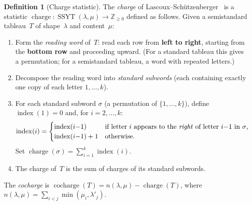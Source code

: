 \documentclass[11pt]{article}
\theoremstyle{plain}
\theoremstyle{definition}
\newtheorem{definition}[theorem]{Definition}
\theoremstyle{remark}
\newcommand{\Z}{\mathbb{Z}}
\newcommand{\charge}{\operatorname{charge}}
\newcommand{\cocharge}{\operatorname{cocharge}}
\newcommand{\SSYT}{\operatorname{SSYT}}
\begin{document}
\begin{definition}[Charge statistic]\label{def:charge}
The \emph{charge} of Lascoux--Sch\"utzen\-ber\-ger~\cite{LS78}
is a statistic $\charge : \SSYT(\lambda, \mu) \to \Z_{\geq 0}$
defined as follows.  Given a semistandard tableau~$T$ of
shape~$\lambda$ and content~$\mu$:
\begin{enumerate}
\item Form the \emph{reading word} of~$T$: read each row
  from \textbf{left to right}, starting from the \textbf{bottom
  row} and proceeding upward.
  (For a standard tableau this gives a permutation;
  for a semistandard tableau, a word with repeated letters.)
\item Decompose the reading word into \emph{standard subwords}
  (each containing exactly one copy of each letter $1, \ldots, k$).
\item For each standard subword $\sigma$ (a permutation of
  $\{1,\ldots,k\}$), define $\operatorname{index}(1) = 0$
  and, for $i = 2, \ldots, k$:
  \[
    \operatorname{index}(i) =
    \begin{cases}
      \operatorname{index}(i{-}1) & \text{if letter $i$ appears
        to the \emph{right} of letter $i{-}1$ in $\sigma$,} \\
      \operatorname{index}(i{-}1) + 1 & \text{otherwise.}
    \end{cases}
  \]
  Set $\charge(\sigma) = \sum_{i=1}^{k} \operatorname{index}(i)$.
\item The charge of~$T$ is the sum of charges of its
  standard subwords.
\end{enumerate}
The \emph{cocharge} is $\cocharge(T) = n(\lambda,\mu) - \charge(T)$,
where $n(\lambda,\mu) = \sum_{i < j} \min(\mu_i, \lambda'_j)$.
\end{definition}
\end{document}
